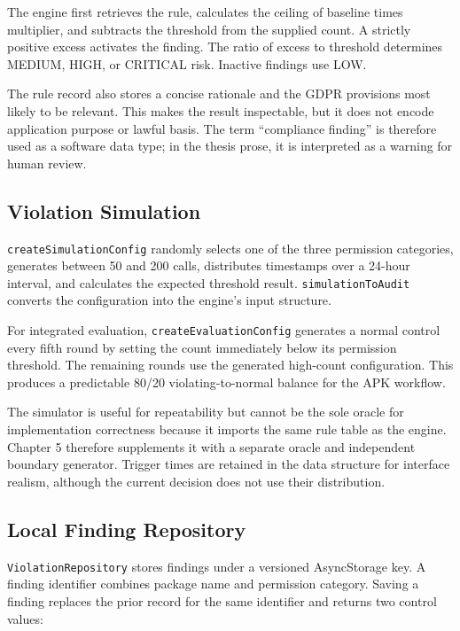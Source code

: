 The engine first retrieves the rule, calculates the ceiling of baseline times multiplier, and subtracts the threshold from the supplied count. A strictly positive excess activates the finding. The ratio of excess to threshold determines MEDIUM, HIGH, or CRITICAL risk. Inactive findings use LOW.

The rule record also stores a concise rationale and the GDPR provisions most likely to be relevant. This makes the result inspectable, but it does not encode application purpose or lawful basis. The term ``compliance finding'' is therefore used as a software data type; in the thesis prose, it is interpreted as a warning for human review.

\subsection{Violation Simulation}

\texttt{createSimulationConfig} randomly selects one of the three permission categories, generates between 50 and 200 calls, distributes timestamps over a 24-hour interval, and calculates the expected threshold result. \texttt{simulationToAudit} converts the configuration into the engine's input structure.

For integrated evaluation, \texttt{createEvaluationConfig} generates a normal control every fifth round by setting the count immediately below its permission threshold. The remaining rounds use the generated high-count configuration. This produces a predictable 80/20 violating-to-normal balance for the APK workflow.

The simulator is useful for repeatability but cannot be the sole oracle for implementation correctness because it imports the same rule table as the engine. Chapter 5 therefore supplements it with a separate oracle and independent boundary generator. Trigger times are retained in the data structure for interface realism, although the current decision does not use their distribution.

\subsection{Local Finding Repository}

\texttt{ViolationRepository} stores findings under a versioned AsyncStorage key. A finding identifier combines package name and permission category. Saving a finding replaces the prior record for the same identifier and returns two control values:

